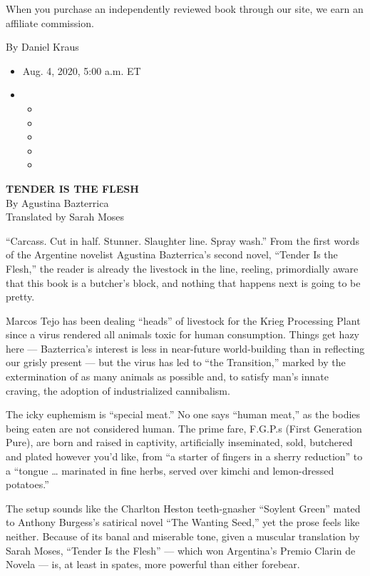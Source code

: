 When you purchase an independently reviewed book through our site, we
earn an affiliate commission.

By Daniel Kraus

\begin{itemize}
\item
  Aug. 4, 2020, 5:00 a.m. ET
\item
  \begin{itemize}
  \item
  \item
  \item
  \item
  \item
  \end{itemize}
\end{itemize}

\textbf{TENDER IS THE FLESH}\\
By Agustina Bazterrica\\
Translated by Sarah Moses

``Carcass. Cut in half. Stunner. Slaughter line. Spray wash.'' From the
first words of the Argentine novelist Agustina Bazterrica's second
novel, ``Tender Is the Flesh,'' the reader is already the livestock in
the line, reeling, primordially aware that this book is a butcher's
block, and nothing that happens next is going to be pretty.

Marcos Tejo has been dealing ``heads'' of livestock for the Krieg
Processing Plant since a virus rendered all animals toxic for human
consumption. Things get hazy here --- Bazterrica's interest is less in
near-future world-building than in reflecting our grisly present --- but
the virus has led to ``the Transition,'' marked by the extermination of
as many animals as possible and, to satisfy man's innate craving, the
adoption of industrialized cannibalism.

The icky euphemism is ``special meat.'' No one says ``human meat,'' as
the bodies being eaten are not considered human. The prime fare, F.G.P.s
(First Generation Pure), are born and raised in captivity, artificially
inseminated, sold, butchered and plated however you'd like, from ``a
starter of fingers in a sherry reduction'' to a ``tongue \ldots{}
marinated in fine herbs, served over kimchi and lemon-dressed
potatoes.''

The setup sounds like the Charlton Heston teeth-gnasher ``Soylent
Green'' mated to Anthony Burgess's satirical novel ``The Wanting Seed,''
yet the prose feels like neither. Because of its banal and miserable
tone, given a muscular translation by Sarah Moses, ``Tender Is the
Flesh'' --- which won Argentina's Premio Clarin de Novela --- is, at
least in spates, more powerful than either forebear.

